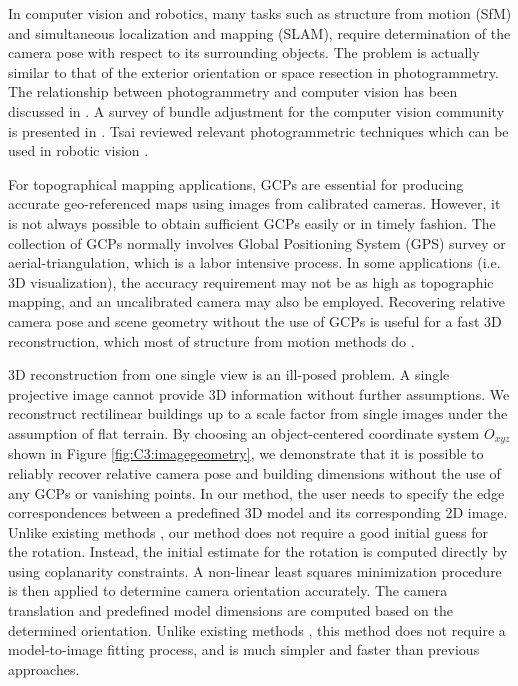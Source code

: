 In computer vision and robotics, many tasks such as structure from motion (SfM) and simultaneous localization and mapping (SLAM), require determination of the camera pose with respect to its surrounding objects. The problem is actually similar to that of the exterior orientation or space resection in photogrammetry. The relationship between photogrammetry and computer vision has been discussed in \cite {Mundy93therelationship, Forstner02photogram}. A survey of bundle adjustment for the computer vision community is presented in \cite{Bill00}. Tsai reviewed relevant photogrammetric techniques which can be used in robotic vision \cite{Tsai92}.

For topographical mapping applications, GCPs are essential for producing accurate geo-referenced maps using images from calibrated cameras. However, it is not always possible to obtain sufficient GCPs easily or in timely fashion. The collection of GCPs normally involves Global Positioning System (GPS) survey or aerial-triangulation, which is a labor intensive process. In some applications (i.e. 3D visualization), the accuracy requirement may not be as high as topographic mapping, and an uncalibrated camera may also be employed. Recovering relative camera pose and scene geometry without the use of GCPs is useful for a fast 3D reconstruction, which most of structure from motion methods do \cite{Pollefeys04, Snavely2006, Agarwal2009}. 
 
3D reconstruction from one single view is an ill-posed problem. A single projective image cannot provide 3D information without further assumptions. We reconstruct rectilinear buildings up to a scale factor from single images under the assumption of flat terrain. By choosing an object-centered coordinate system $O_{xyz}$ shown in Figure \ref{fig:C3:imagegeometry}, we demonstrate that it is  possible to reliably recover relative camera pose and building dimensions without the use of any GCPs or vanishing points. In our method, the user needs to specify the edge correspondences between a predefined 3D model and its corresponding 2D image. Unlike existing methods \cite{Liu90, Kumar94, Taylor95}, our method does not require a good initial guess for the rotation. Instead, the  initial estimate for the rotation is computed directly by using coplanarity constraints. A non-linear least squares minimization procedure is then applied to determine camera orientation accurately. The camera translation and predefined model dimensions are computed based on the determined orientation. Unlike existing methods  \cite{Lowe91, Debevec96}, this method does not require a model-to-image fitting process, and is much simpler and faster than previous approaches. 

